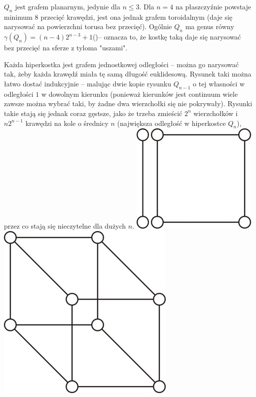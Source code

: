 \documentclass{pracamgr}
\begin{document}
   $Q_n$ jest grafem planarnym, jedynie dla $n\le3$.\newline
   Dla $n=4$ na płaszczyźnie powstaje minimum $8$ przecięć krawędzi,
   jest ona jednak grafem toroidalnym (daje się narysować na powierzchni torusa bez przecięć).\newline
   Ogólnie $Q_n$ ma genus równy ${\gamma(Q_n)=(n-4)2^{n-3}+1}$\newline (\cite{HHH})-- oznacza to, że kostkę taką daje się
   narysować bez przecięć na sferze z tyloma "uszami".\newline
   
   Każda hiperkostka jest grafem jednostkowej odległości -- można go narysować tak, żeby każda krawędź miała tę samą długość euklidesową.
   Rysunek taki można łatwo dostać indukcyjnie -- malując dwie kopie rysunku $Q_{n-1}$ o tej własności w odległości $1$ w dowolnym kierunku
   (ponieważ kierunków jest continuum wiele zawsze można wybrać taki, by żadne dwa wierzchołki się nie pokrywały).
   Rysunki takie stają się jednak coraz gęstsze, jako że  trzeba zmieścić $2^n$ wierzchołków i $n2^{n-1}$ krawędzi na kole o średnicy $n$
   (największa odległość w hiperkostce $Q_n$), przez co stają się nieczytelne dla dużych $n$.\newline
   \includegraphics[scale=1]{img/unitary_1.jpg}
   \includegraphics[scale=1]{img/unitary_2.jpg}
   \includegraphics[scale=1]{img/unitary_3.jpg}
\end{document}
